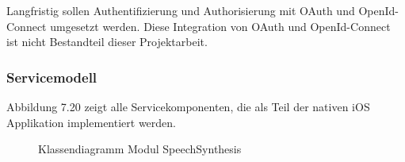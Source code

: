 Langfristig sollen Authentifizierung und Authorisierung mit OAuth und OpenId-Connect umgesetzt werden.
Diese Integration von OAuth und OpenId-Connect ist nicht Bestandteil dieser Projektarbeit.

\clearpage

\subsubsection{Servicemodell}

Abbildung 7.20 zeigt alle Servicekomponenten, die als Teil der nativen iOS Applikation implementiert werden.

\begin{figure}[h]
    \centering
    \begin{minipage}[b]{1\textwidth}
        \caption{Klassendiagramm Modul SpeechSynthesis}
    \end{minipage}
\end{figure}

\clearpage


\clearpage
